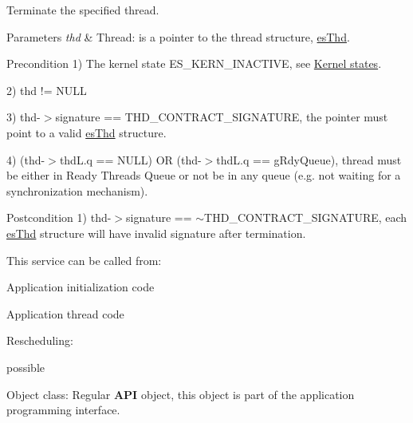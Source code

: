Terminate the specified thread. 


\begin{DoxyParams}{Parameters}
{\em thd} & Thread\-: is a pointer to the thread structure, \hyperlink{structesThd}{es\-Thd}. \\
\hline
\end{DoxyParams}
\begin{DoxyPrecond}{Precondition}
1) {\ttfamily The kernel state E\-S\-\_\-\-K\-E\-R\-N\-\_\-\-I\-N\-A\-C\-T\-I\-V\-E}, see \hyperlink{states}{Kernel states}. 

2) {\ttfamily thd != N\-U\-L\-L} 

3) {\ttfamily thd-\/$>$signature == T\-H\-D\-\_\-\-C\-O\-N\-T\-R\-A\-C\-T\-\_\-\-S\-I\-G\-N\-A\-T\-U\-R\-E}, the pointer must point to a valid \hyperlink{structesThd}{es\-Thd} structure. 

4) {\ttfamily (thd-\/$>$thd\-L.\-q == N\-U\-L\-L) O\-R (thd-\/$>$thd\-L.\-q == g\-Rdy\-Queue)}, thread must be either in Ready Threads Queue or not be in any queue (e.\-g. not waiting for a synchronization mechanism). 
\end{DoxyPrecond}
\begin{DoxyPostcond}{Postcondition}
1) {\ttfamily thd-\/$>$signature == $\sim$\-T\-H\-D\-\_\-\-C\-O\-N\-T\-R\-A\-C\-T\-\_\-\-S\-I\-G\-N\-A\-T\-U\-R\-E}, each \hyperlink{structesThd}{es\-Thd} structure will have invalid signature after termination. 
\end{DoxyPostcond}
\begin{DoxyParagraph}{This service can be called from\-:}

\begin{DoxyItemize}
\item Application initialization code
\item Application thread code 
\end{DoxyItemize}
\end{DoxyParagraph}
\begin{DoxyParagraph}{Rescheduling\-:}

\begin{DoxyItemize}
\item possible 
\end{DoxyItemize}
\end{DoxyParagraph}
\begin{DoxyParagraph}{Object class\-:}
Regular {\bfseries A\-P\-I} object, this object is part of the application programming interface. 
\end{DoxyParagraph}
